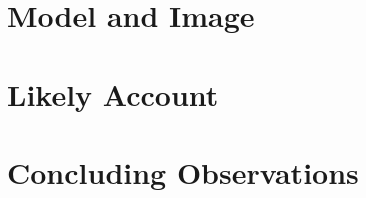 
\section{Model and Image} %
\label{sec:model_and_image}




\section{Likely Account} %
\label{sec:likely_account}




\section{Concluding Observations} %
\label{sec:concluding_observations}




